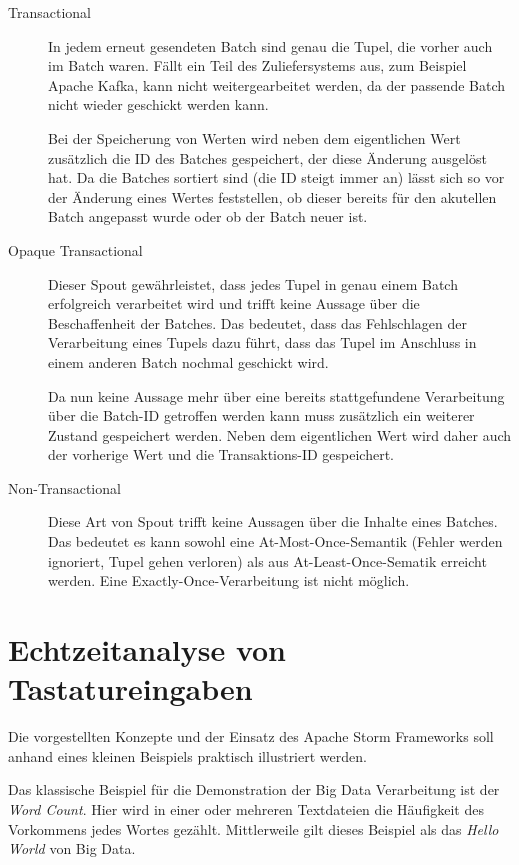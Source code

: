 \documentclass[a4paper,11pt]{scrartcl}
\begin{document}
  \begin{description}
    \item[Transactional] In jedem erneut gesendeten Batch sind genau
      die Tupel, die vorher auch im Batch waren. Fällt ein Teil des
      Zuliefersystems aus, zum Beispiel Apache Kafka, kann nicht
      weitergearbeitet werden, da der passende Batch nicht wieder
      geschickt werden kann.

      Bei der Speicherung von Werten wird neben dem eigentlichen Wert
      zusätzlich die ID des Batches gespeichert, der diese Änderung
      ausgelöst hat. Da die Batches sortiert sind (die ID steigt immer
      an) lässt sich so vor der Änderung eines Wertes feststellen, ob
      dieser bereits für den akutellen Batch angepasst wurde oder ob
      der Batch neuer ist.
    \item[Opaque Transactional]
      Dieser Spout gewährleistet, dass jedes Tupel in genau einem
      Batch erfolgreich verarbeitet wird und trifft keine Aussage über
      die Beschaffenheit der Batches. Das bedeutet, dass das
      Fehlschlagen der Verarbeitung eines Tupels dazu führt, dass das
      Tupel im Anschluss in einem anderen Batch nochmal geschickt
      wird.

      Da nun keine Aussage mehr über eine bereits stattgefundene
      Verarbeitung über die Batch-ID getroffen werden kann muss
      zusätzlich ein weiterer Zustand gespeichert werden. Neben dem
      eigentlichen Wert wird daher auch der vorherige Wert und die
      Transaktions-ID gespeichert.
    \item[Non-Transactional]
      Diese Art von Spout trifft keine Aussagen über die Inhalte eines
      Batches. Das bedeutet es kann sowohl eine At-Most-Once-Semantik
      (Fehler werden ignoriert, Tupel gehen verloren) als aus
      At-Least-Once-Sematik erreicht werden. Eine
      Exactly-Once-Verarbeitung ist nicht möglich.
  \end{description}

  \section{Echtzeitanalyse von Tastatureingaben}
  Die vorgestellten Konzepte und der Einsatz des Apache Storm
  Frameworks soll anhand eines kleinen Beispiels praktisch illustriert
  werden.

  Das klassische Beispiel für die Demonstration der Big Data
  Verarbeitung ist der \textit{Word Count}. Hier wird in einer oder
  mehreren Textdateien die Häufigkeit des Vorkommens jedes Wortes
  gezählt. Mittlerweile gilt dieses Beispiel als das \textit{Hello
  World} von Big Data.
\end{document}
